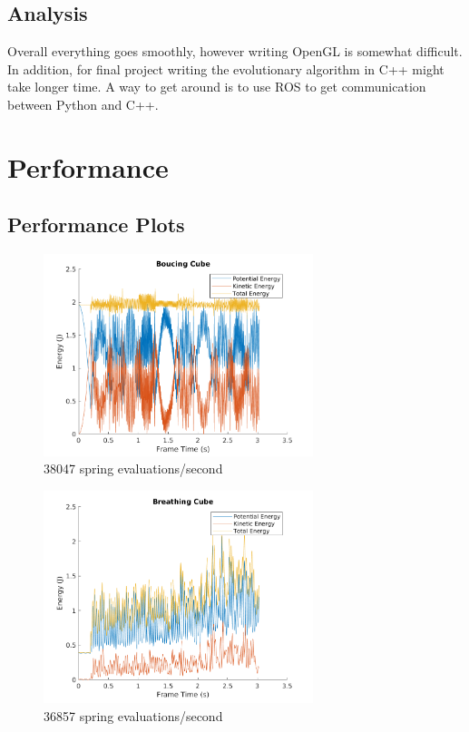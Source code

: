 \documentclass[12pt]{article}
\begin{document}
\subsection{Analysis}
Overall everything goes smoothly, however writing OpenGL is somewhat difficult. In addition, for final project writing the evolutionary algorithm in C++ might take longer time. A way to get around is to use ROS to get communication between Python and C++.


\newpage
\section{Performance}
\subsection{Performance Plots}
\begin{figure}[H]
	\centering
	\includegraphics[width=0.7\textwidth]{BouncingCubeEnergy}
	\caption[]%
	{{\small 38047 spring evaluations/second}}    
\end{figure}
\begin{figure}[H]
	\centering
	\includegraphics[width=0.7\textwidth]{BreathingCubeEnergy}
	\caption[]%
	{{\small 36857 spring evaluations/second}}    
\end{figure}
\newpage
\end{document}
